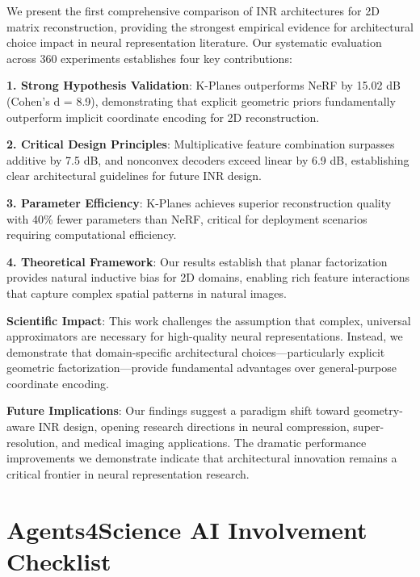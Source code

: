 \documentclass{article}
\begin{document}
We present the first comprehensive comparison of INR architectures for 2D matrix reconstruction, providing the strongest empirical evidence for architectural choice impact in neural representation literature. Our systematic evaluation across 360 experiments establishes four key contributions:

\textbf{1. Strong Hypothesis Validation}: K-Planes outperforms NeRF by 15.02 dB (Cohen's d = 8.9), demonstrating that explicit geometric priors fundamentally outperform implicit coordinate encoding for 2D reconstruction.

\textbf{2. Critical Design Principles}: Multiplicative feature combination surpasses additive by 7.5 dB, and nonconvex decoders exceed linear by 6.9 dB, establishing clear architectural guidelines for future INR design.

\textbf{3. Parameter Efficiency}: K-Planes achieves superior reconstruction quality with 40\% fewer parameters than NeRF, critical for deployment scenarios requiring computational efficiency.

\textbf{4. Theoretical Framework}: Our results establish that planar factorization provides natural inductive bias for 2D domains, enabling rich feature interactions that capture complex spatial patterns in natural images.

\textbf{Scientific Impact}: This work challenges the assumption that complex, universal approximators are necessary for high-quality neural representations. Instead, we demonstrate that domain-specific architectural choices—particularly explicit geometric factorization—provide fundamental advantages over general-purpose coordinate encoding.

\textbf{Future Implications}: Our findings suggest a paradigm shift toward geometry-aware INR design, opening research directions in neural compression, super-resolution, and medical imaging applications. The dramatic performance improvements we demonstrate indicate that architectural innovation remains a critical frontier in neural representation research.

\small



\newpage
\section*{Agents4Science AI Involvement Checklist}
\end{document}

